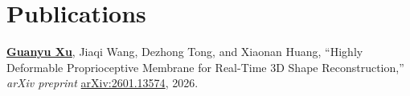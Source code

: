 \documentclass[12pt,letterpaper]{article}
\begin{document}
\section{\textbf{Publications}}
\begingroup\small
\begin{enumerate}[leftmargin=*, labelsep=0.5em, align=left, widest={[\textbf{S.1}]}, itemindent=0em, label={\textbf{[\arabic*]}]}]


\item[\textbf{[1]}] \textbf{\underline{Guanyu Xu}}, Jiaqi Wang, Dezhong Tong, and Xiaonan Huang, ``Highly Deformable Proprioceptive Membrane for Real-Time 3D Shape Reconstruction,'' \textit{arXiv preprint} \href{https://arxiv.org/abs/2601.13574}{arXiv:2601.13574}, 2026. 

\end{enumerate}
\endgroup
\end{document}
